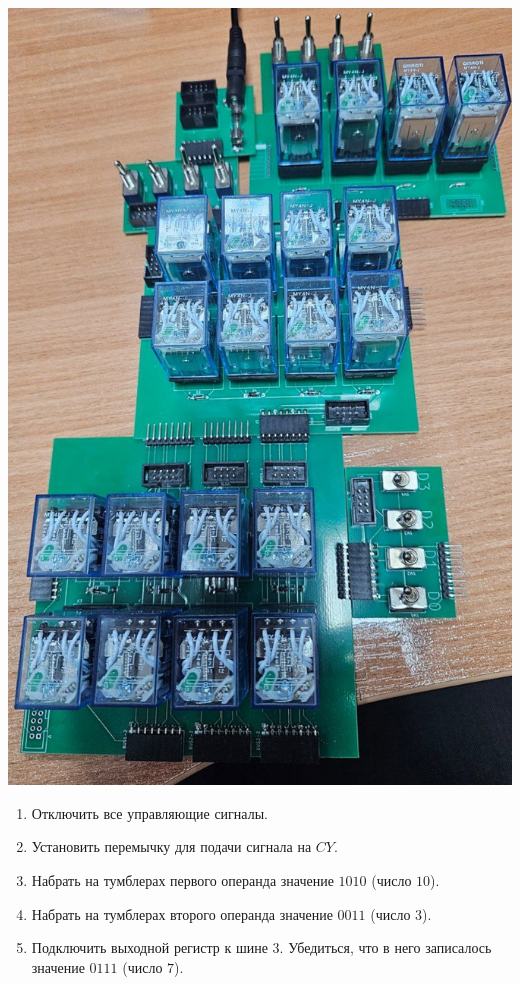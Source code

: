 \includegraphics[width=0.5\columnwidth]{photo/subtractor.jpg}

\begin{enumerate}
    \item Отключить все управляющие сигналы.
    \item Установить перемычку для подачи сигнала на $CY$.
    \item Набрать на тумблерах первого операнда значение $1010$ (число $10$).
    \item Набрать на тумблерах второго операнда значение $0011$ (число $3$).
    \item Подключить выходной регистр к шине $3$. Убедиться, что в него записалось значение $0111$ (число $7$).
\end{enumerate}
